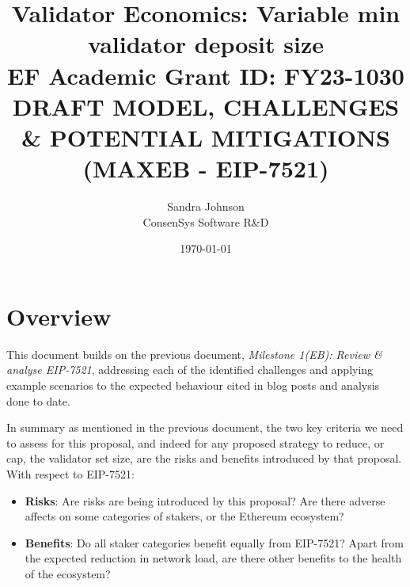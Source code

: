 \documentclass[UTF8]{article}
\title{Validator Economics: Variable min validator deposit size\\
\vspace{4pt}
\large EF Academic Grant ID: FY23-1030\\
\vspace{16pt}
DRAFT MODEL, CHALLENGES \& POTENTIAL MITIGATIONS\\
(MAXEB - EIP-7521) }
\author{Sandra Johnson\\
ConsenSys Software R\&D}
\date{\today}                                           %
\begin{document}
\maketitle



\section{Overview}
This document builds on the previous document, \textit{Milestone 1(EB): Review \& analyse EIP-7521}, addressing each of the identified challenges and applying example scenarios to the expected behaviour cited in blog posts and analysis done to date.

In summary as mentioned in the previous document, the two key criteria we need to assess for this proposal, and indeed for any proposed strategy to reduce, or cap, the validator set size, are the risks and benefits introduced by that proposal. \\

\noindent
With respect to EIP-7521:
\begin{itemize}
\item \textbf{Risks}: Are risks are being introduced by this proposal? Are there adverse affects on some categories of stakers, or the Ethereum ecosystem?
\item  \textbf{Benefits}: Do all staker categories benefit equally from EIP-7521? Apart from the expected reduction in network load, are there other benefits to the health of the ecosystem?
\end{itemize}
\end{document}
